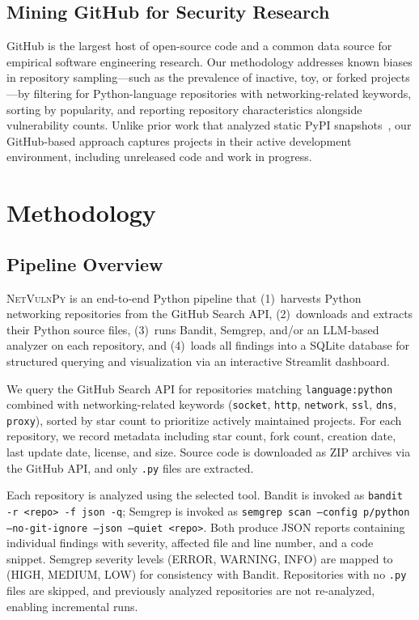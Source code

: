 \documentclass[sigconf,authordraft]{acmart}
\begin{document}
\subsection{Mining GitHub for Security Research}

GitHub is the largest host of open-source code and a common data
source for empirical software engineering research. Our methodology
addresses known biases in repository sampling---such as the
prevalence of inactive, toy, or forked projects---by filtering for
Python-language repositories with networking-related keywords, sorting
by popularity, and reporting repository characteristics alongside
vulnerability counts. Unlike prior work that analyzed static PyPI
snapshots~\cite{Ruohonen2021}, our GitHub-based approach captures
projects in their active development environment, including unreleased
code and work in progress.


\section{Methodology}
\label{sec:methodology}

\subsection{Pipeline Overview}

\textsc{NetVulnPy} is an end-to-end Python pipeline that
(1)~harvests Python networking repositories from the GitHub Search
API, (2)~downloads and extracts their Python source files,
(3)~runs Bandit, Semgrep, and/or an LLM-based analyzer on each
repository, and (4)~loads all findings into a SQLite database for
structured querying and visualization via an interactive Streamlit
dashboard.

We query the GitHub Search API for repositories matching
\texttt{language:python} combined with networking-related keywords
(\texttt{socket}, \texttt{http}, \texttt{network}, \texttt{ssl},
\texttt{dns}, \texttt{proxy}), sorted by star count to prioritize
actively maintained projects. For each repository, we record metadata
including star count, fork count, creation date, last update date,
license, and size. Source code is downloaded as ZIP archives via the
GitHub API, and only \texttt{.py} files are extracted.

Each repository is analyzed using the selected tool. Bandit is
invoked as \texttt{bandit -r <repo> -f json -q}; Semgrep is invoked
as \texttt{semgrep scan --config p/python --no-git-ignore --json
--quiet <repo>}. Both produce JSON reports containing individual
findings with severity, affected file and line number, and a code
snippet. Semgrep severity levels (ERROR, WARNING, INFO) are mapped to
(HIGH, MEDIUM, LOW) for consistency with Bandit. Repositories with no
\texttt{.py} files are skipped, and previously analyzed repositories
are not re-analyzed, enabling incremental runs.
\end{document}
